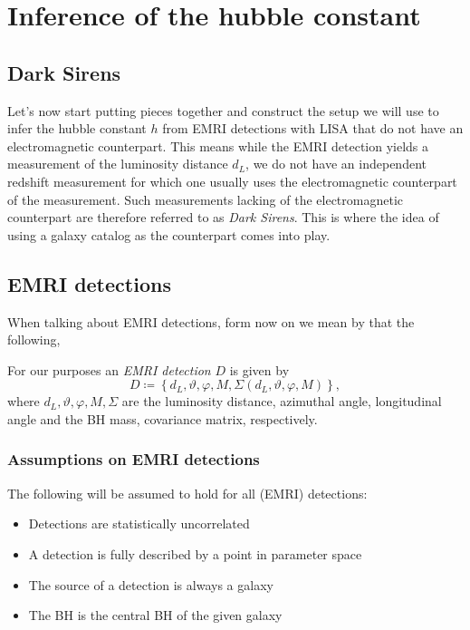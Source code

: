 \chapter{Inference of the hubble constant}

\section{Dark Sirens}

Let's now start putting pieces together and construct the setup we will use to infer the hubble constant $h$ from EMRI detections with LISA that do not have an electromagnetic counterpart. This means while the EMRI detection yields a measurement of the luminosity distance $d_L$, we do not have an independent redshift measurement for which one usually uses the electromagnetic counterpart of the measurement. Such measurements lacking of the electromagnetic counterpart are therefore referred to as \emph{Dark Sirens}. This is where the idea of using a galaxy catalog as the counterpart comes into play.

\section{EMRI detections}

When talking about EMRI detections, form now on we mean by that the following,
\begin{definition}
    For our purposes an \emph{EMRI detection} $D$ is given by 
    \begin{equation}
        \label{eq:emri-detection}
        D \coloneqq \left \{ d_L, \vartheta, \varphi, M, \Sigma(d_L, \vartheta, \varphi, M)\right \},
    \end{equation}
    where $d_L, \vartheta, \varphi, M, \Sigma$ are the luminosity distance, azimuthal angle, longitudinal angle and the BH mass, covariance matrix, respectively. 
\end{definition}

\subsection{Assumptions on EMRI detections}
The following will be assumed to hold for all (EMRI) detections:
\begin{itemize}
    \item Detections are statistically uncorrelated
    \item A detection is fully described by a point in parameter space
    \item The source of a detection is always a galaxy
    \item The BH is the central BH of the given galaxy
\end{itemize}

